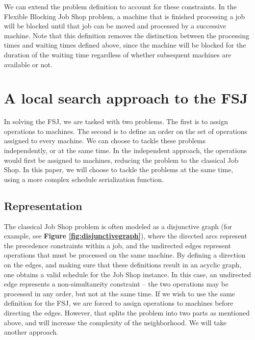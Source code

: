 \documentclass[a4paper,10pt]{article}
\begin{document}
We can extend the problem definition to account for these constraints. In the Flexible Blocking Job Shop problem, a machine that is finished processing a job will be blocked until that job can be moved and processed by a successive machine. Note that this definition removes the distinction between the processing times and waiting times defined above, since the machine will be blocked for the duration of the waiting time regardless of whether subsequent machines are available or not.

\section{A local search approach to the FSJ}

In solving the FSJ, we are tasked with two problems. The first is to assign operations to machines. The second is to define an order on the set of operations assigned to every machine. We can choose to tackle these problems independently, or at the same time. In the independent approach, the operations would first be assigned to machines, reducing the problem to the classical Job Shop. In this paper, we will choose to tackle the problems at the same time, using a more complex schedule serialization function.

\subsection{Representation}

The classical Job Shop problem is often modeled as a disjunctive graph (for example, see \textbf{Figure \ref{fig:disjunctivegraph}}), where the directed arcs represent the precedence constraints within a job, and the undirected edges represent operations that must be processed on the same machine. By defining a direction on the edges, and making sure that these definitions result in an acyclic graph, one obtains a valid schedule for the Job Shop instance. In this case, an undirected edge represents a non-simultaneity constraint -- the two operations may be processed in any order, but not at the same time. If we wish to use the same definition for the FSJ, we are forced to assign operations to machines before directing the edges. However, that splits the problem into two parts as mentioned above, and will increase the complexity of the neighborhood. We will take another approach.
\end{document}
